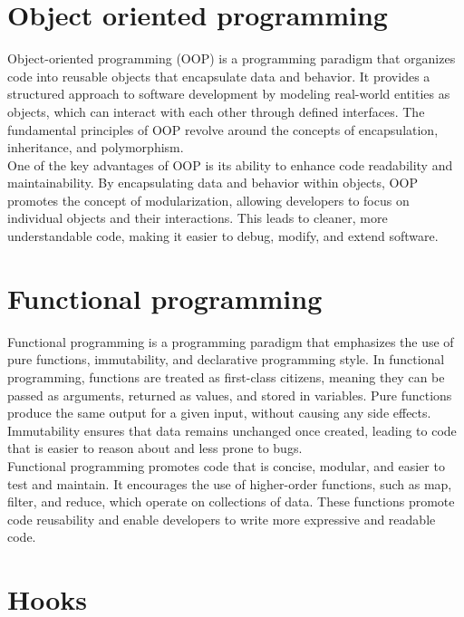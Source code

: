 \section{Object oriented programming}
\label{sec:OO-programming}

Object-oriented programming (OOP) is a programming paradigm that organizes code into reusable objects that encapsulate data and behavior. It provides a structured approach to software development by modeling real-world entities as objects, which can interact with each other through defined interfaces. The fundamental principles of OOP revolve around the concepts of encapsulation, inheritance, and polymorphism. \cite{educba_OO_advantages} \\

\noindent
One of the key advantages of OOP is its ability to enhance code readability and maintainability. By encapsulating data and behavior within objects, OOP promotes the concept of modularization, allowing developers to focus on individual objects and their interactions. This leads to cleaner, more understandable code, making it easier to debug, modify, and extend software. \\

\section{Functional programming}
\label{sec:functional-programming}

Functional programming is a programming paradigm that emphasizes the use of pure functions, immutability, and declarative programming style. In functional programming, functions are treated as first-class citizens, meaning they can be passed as arguments, returned as values, and stored in variables. \cite{freeCodeCamp_FP} Pure functions produce the same output for a given input, without causing any side effects. Immutability ensures that data remains unchanged once created, leading to code that is easier to reason about and less prone to bugs. \\

\noindent
Functional programming promotes code that is concise, modular, and easier to test and maintain. It encourages the use of higher-order functions, such as map, filter, and reduce, which operate on collections of data. These functions promote code reusability and enable developers to write more expressive and readable code. \\

\section{Hooks}
\label{sec:hooks-theory}

